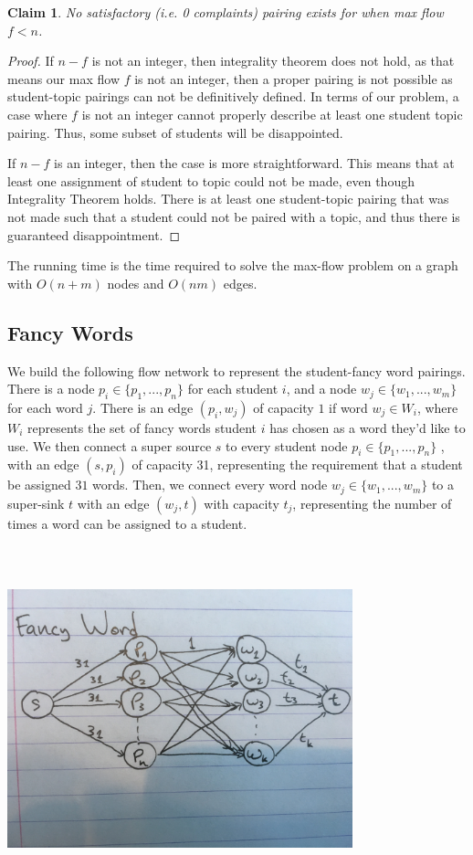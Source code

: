 \documentclass[11pt]{article}
\newtheorem{claim}[theorem]{Claim}
\begin{document}
\begin{claim}
No satisfactory (i.e. 0 complaints) pairing exists for when max flow $f < n$.
\end{claim}
\begin{proof}
If $n-f$ is not an integer, then integrality theorem does not hold, as that means our max flow $f$ is not an integer, then a proper pairing is not possible as student-topic pairings can not be definitively defined. In terms of our problem, a case where $f$ is not an integer cannot properly describe at least one student topic pairing. Thus, some subset of students will be disappointed.

If $n-f$ is an integer, then the case is more straightforward. This means that at least one assignment of student to topic could not be made, even though Integrality Theorem holds. There is at least one student-topic pairing that was not made such that a student could not be paired with a topic, and thus there is guaranteed disappointment. 
\end{proof}

The running time is the time required to solve the max-flow problem on a graph with $O(n+m)$ nodes and $O(nm)$ edges.

\subsection*{Fancy Words}
We build the following flow network to represent the student-fancy word pairings. There is a node $p_i\in \{p_1, ..., p_n\}$ for each student $i$, and a node $w_j \in \{w_1, ..., w_m\}$ for each word $j$. There is an edge $(p_i, w_j)$ of capacity $1$ if word $w_j \in W_i$, where $W_i$ represents the set of fancy words student $i$ has chosen as a word they'd like to use. We then connect a super source $s$ to every student node $p_i \in \{p_1, ..., p_n\}$ , with an edge $(s, p_i)$ of capacity 31, representing the requirement that a student be assigned $31$ words. Then, we connect every word node $w_j \in \{w_1, ..., w_m\}$ to a super-sink $t$ with an edge $(w_j, t)$ with capacity $t_j$, representing the number of times a word can be assigned to a student.
\begin{center}
\includegraphics[width=10cm,height=10cm,keepaspectratio]{q3_fancywords}
\end{center}
\end{document}
